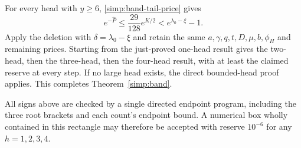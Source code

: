 For every head with $y\ge6$, \eqref{simp:band-tail-price} gives
\[
 e^{-\widehat P}\le\frac{29}{128}e^{K/2}
                  <e^{\lambda_0-\xi}-1.
\]
Apply the deletion with $\delta=\lambda_0-\xi$ and retain the same
$a,\gamma,q,t,D,\mu,b,\phi_H$ and remaining prices.
Starting from the just-proved one-head result gives the two-head,
then the three-head, then the four-head result, with at least the
claimed reserve at every step. If no large head exists, the direct
bounded-head proof applies. This completes Theorem~\ref{simp:band}.

All signs above are checked by a single directed endpoint program,
including the three root brackets and each count's endpoint bound.
A numerical box wholly contained in this rectangle may therefore
be accepted with reserve $10^{-6}$ for any $h=1,2,3,4$.
